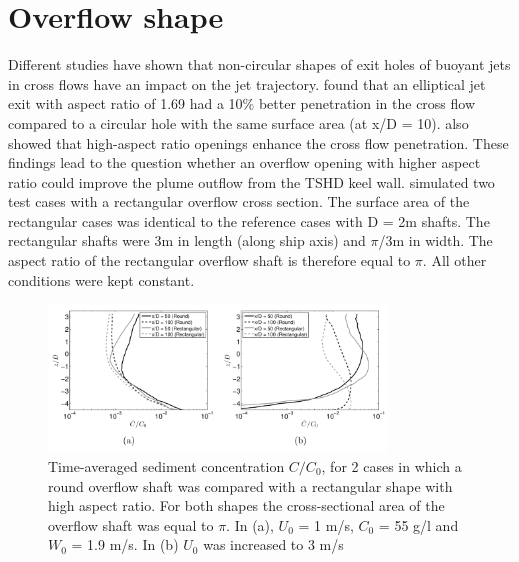 


\section{Overflow shape}
\label{sec:shape}

Different studies have shown that non-circular shapes of exit holes of buoyant jets in cross flows have an impact on the jet trajectory. \cite{Salewski+} found that an elliptical jet exit with aspect ratio of 1.69 had a 10\% better penetration in the cross flow compared to a circular hole with the same surface area (at x/D = 10). \cite{Haven+} also showed that high-aspect ratio openings enhance the cross flow penetration. \newline
\noindent These findings lead to the question whether an overflow opening with higher aspect ratio could improve the plume outflow from the TSHD keel wall. \cite{Decrop} simulated  two test cases with a rectangular overflow cross section. The surface area of the rectangular cases was identical to the reference cases with D = 2m shafts. The rectangular shafts were 3m in length (along ship axis) and $\pi$/3m in width. The aspect ratio of the rectangular overflow shaft is therefore equal to $\pi$. All other conditions were kept constant.

\begin{figure}[ht!]
    \centering
    \includegraphics[width = 0.8\textwidth]{Images/Overflow_shape.png}
    \caption{Time-averaged sediment concentration $C/C_0$, for 2 cases in which a round overflow shaft was compared with a rectangular shape with high aspect ratio. For both shapes the cross-sectional area of the overflow shaft was equal to $\pi$. In (a), $U_0$ = 1 m/s, $C_0$ = 55 g/l and $W_0$ = 1.9 m/s. In (b) $U_0$ was increased to 3 m/s}
    \label{fig:Overflow_shape}
\end{figure}

